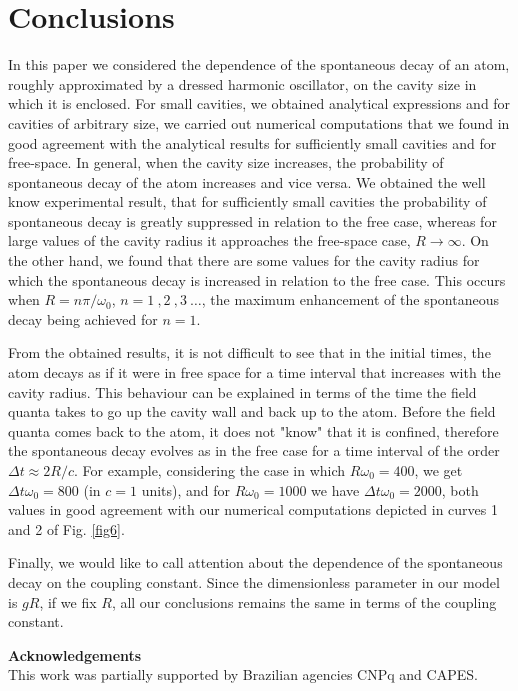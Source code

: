 \documentclass[10pt,english,twocolumn]{revtex4}
\begin{document}
\section{Conclusions}

In this paper we considered the dependence of the spontaneous decay of an atom, roughly approximated by a dressed  harmonic oscillator,
on the cavity size in which it is enclosed. 
For  small cavities, we obtained analytical expressions and for cavities of arbitrary size, we carried out
numerical computations that we found in good agreement with the analytical results for sufficiently small cavities and for free-space. In general, when the cavity size  increases, the probability of spontaneous decay of the atom increases and vice versa. We obtained the well know experimental result, that for
sufficiently small cavities the probability of spontaneous decay is greatly suppressed in relation to the free case, 
whereas for large values of the cavity radius it approaches the free-space case, $R\to\infty$. On the other
hand, we found that there are some values for the cavity radius for which the spontaneous decay is increased in relation to the free case. This occurs when
$R=n\pi/\omega_0$, $n=1\ ,2\ ,3\ \ldots$, the maximum enhancement of the spontaneous decay being achieved for $n=1$.  

From the obtained results, it is not difficult to see that in the initial times,  the atom decays as if it were in free space for a time interval that increases with 
the cavity radius. This behaviour can be explained in terms of the time  the field quanta takes to go up the cavity wall and back up to the atom. Before
the field quanta comes back to the atom, it does not "know" that it is confined, therefore the spontaneous decay evolves as in the free case for a time
interval of the order $\Delta t\approx 2R/c$. For example, considering the case in which $R\omega_0=400$, we get 
 $\Delta t \omega_0=800$ (in $c=1$ units), and for $R\omega_0=1000$ we have $\Delta t\omega_0=2000$, both values
 in good agreement with our numerical computations depicted in curves 1 and 2 of Fig. \ref{fig6}. 

Finally, we would like to call attention about the dependence of the spontaneous decay on the coupling constant. Since the 
dimensionless parameter in our model is $gR$, if we fix $R$, all our conclusions remains the same in terms of the coupling constant. 


{\bf Acknowledgements}\\
This work was partially supported by Brazilian agencies CNPq and CAPES.
	
\end{document}
